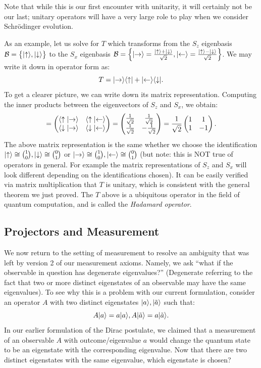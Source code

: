 Note that while this is our first encounter with unitarity, it will certainly not be our last; unitary operators will have a very large role to play when we consider Schr\"{o}dinger evolution.

As an example, let us solve for $T$ which transforms from the $S_z$ eigenbasis $\mathcal{B} = \set{\lvert \uparrow \rangle, \lvert \downarrow \rangle}$ to the $S_x$ eigenbasis $\mathcal{B} = \set{\lvert \rightarrow \rangle = \frac{\lvert \uparrow \rangle + \lvert \downarrow \rangle}{\sqrt{2}}, \lvert \leftarrow \rangle = \frac{\lvert \uparrow \rangle - \lvert \downarrow \rangle}{\sqrt{2}}}$. We may write it down in operator form as:
\begin{equation}
    T = \lvert \rightarrow \rangle \langle \uparrow \rvert + \lvert \leftarrow \rangle \langle \downarrow \rvert.
\end{equation}
To get a clearer picture, we can write down its matrix representation. Computing the inner products between the eigenvectors of $S_z$ and $S_x$, we obtain: 
\begin{equation}
    [T] = \mat{\braket{\uparrow}{\rightarrow} & \braket{\uparrow}{\leftarrow} \\ \braket{\downarrow}{\rightarrow} & \braket{\downarrow}{\leftarrow}} = \mat{\frac{1}{\sqrt{2}} & \frac{1}{\sqrt{2}} \\ \frac{1}{\sqrt{2}} & -\frac{1}{\sqrt{2}}} = \frac{1}{\sqrt{2}}\mat{1 & 1 \\ 1 & -1}.
\end{equation}
The above matrix representation is the same whether we choose the identification $\lvert \uparrow \rangle \cong \binom{1}{0}, \lvert \downarrow \rangle \cong \binom{0}{1}$ or $\lvert \rightarrow \rangle \cong \binom{1}{0}, \lvert \leftarrow \rangle \cong \binom{0}{1}$ (but note: this is NOT true of operators in general. For example the matrix representations of $S_z$ and $S_x$ will look different depending on the identifications chosen). It can be easily verified via matrix multiplication that $T$ is unitary, which is consistent with the general theorem we just proved. The $T$ above is a ubiquitous operator in the field of quantum computation, and is called the \emph{Hadamard operator}.

\subsection{Projectors and Measurement}
We now return to the setting of measurement to resolve an ambiguity that was left by version 2 of our measurement axioms. Namely, we ask ``what if the observable in question has degenerate eigenvalues?'' (Degenerate referring to the fact that two or more distinct eigenstates of an observable may have the same eigenvalues). To see why this is a problem with our current formulation, consider an operator $A$ with two distinct eigenstates $\lvert a \rangle, \lvert \tilde{a} \rangle$ such that:
\begin{equation}
    A\lvert a \rangle = a\lvert a \rangle, A\lvert \tilde{a} \rangle = a\lvert \tilde{a} \rangle.
\end{equation}
In our earlier formulation of the Dirac postulate, we claimed that a measurement of an observable $A$ with outcome/eigenvalue $a$ would change the quantum state to be an eigenstate with the corresponding eigenvalue. Now that there are two distinct eigenstates with the same eigenvalue, which eigenstate is chosen?

